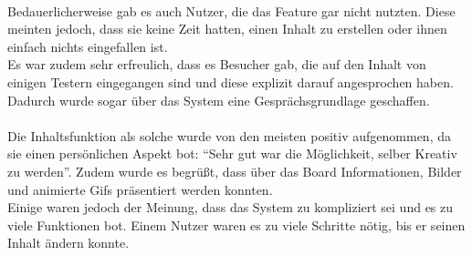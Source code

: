 \\
Bedauerlicherweise gab es auch Nutzer, die das Feature gar nicht nutzten.
Diese meinten jedoch, dass sie keine Zeit hatten, einen Inhalt zu erstellen oder ihnen einfach nichts eingefallen ist.
\\
Es war zudem sehr erfreulich, dass es Besucher gab, die auf den Inhalt von einigen Testern eingegangen sind und diese explizit darauf angesprochen haben.
Dadurch wurde sogar über das System eine Gesprächsgrundlage geschaffen.
\\
\\
Die Inhaltsfunktion als solche wurde von den meisten positiv aufgenommen, da sie einen persönlichen Aspekt bot: ``Sehr gut war die Möglichkeit, selber Kreativ zu werden''.
Zudem wurde es begrüßt, dass über das Board Informationen, Bilder und animierte Gifs präsentiert werden konnten.
\\
Einige waren jedoch der Meinung, dass das System zu kompliziert sei und es zu viele Funktionen bot.
Einem Nutzer waren es zu viele Schritte nötig, bis er seinen Inhalt ändern konnte.





